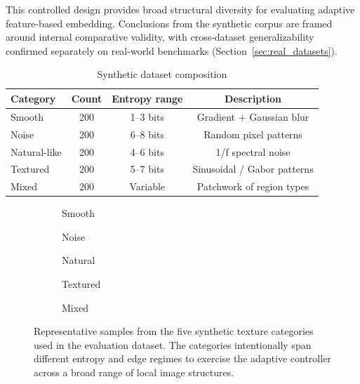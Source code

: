 This controlled design provides broad structural diversity for evaluating adaptive feature-based embedding. Conclusions from the synthetic corpus are framed around internal comparative validity, with cross-dataset generalizability confirmed separately on real-world benchmarks (Section~\ref{sec:real_datasets}).

\begin{table}[H]
\centering
\caption{Synthetic dataset composition}
\label{tab:dataset}
\begin{tabular}{lccc}
\toprule
Category & Count & Entropy range & Description \\
\midrule
Smooth & 200 & 1--3 bits & Gradient + Gaussian blur \\
Noise & 200 & 6--8 bits & Random pixel patterns \\
Natural-like & 200 & 4--6 bits & 1/f spectral noise \\
Textured & 200 & 5--7 bits & Sinusoidal / Gabor patterns \\
Mixed & 200 & Variable & Patchwork of region types \\
\bottomrule
\end{tabular}
\end{table}

\begin{figure}[H]
    \centering
    \begin{subfigure}{0.19\linewidth}
        \caption{Smooth}
    \end{subfigure}
    \begin{subfigure}{0.19\linewidth}
        \caption{Noise}
    \end{subfigure}
    \begin{subfigure}{0.19\linewidth}
        \caption{Natural}
    \end{subfigure}
    \begin{subfigure}{0.19\linewidth}
        \caption{Textured}
    \end{subfigure}
    \begin{subfigure}{0.19\linewidth}
        \caption{Mixed}
    \end{subfigure}
    \caption{Representative samples from the five synthetic texture categories used in the evaluation dataset. The categories intentionally span different entropy and edge regimes to exercise the adaptive controller across a broad range of local image structures.}
    \label{fig:dataset_samples}
\end{figure}

